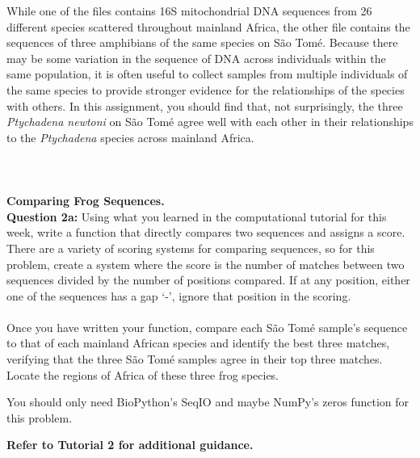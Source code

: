 While one of the files contains 16S mitochondrial DNA sequences from 26
different species scattered throughout mainland Africa, the other file contains
the sequences of three amphibians of the same species on S\~ao Tom\'e. Because
there may be some variation in the sequence of DNA across individuals within the
same population,  it is often useful to collect samples from multiple
individuals of the same species  to provide stronger evidence for the
relationships of the species with others. In this assignment, you should find
that, not surprisingly, the three \emph{Ptychadena newtoni} on S\~ao Tom\'e
agree well with each other in their relationships to the \emph{Ptychadena}
species across mainland Africa.\\
\\
\\
\\
{\bf{Comparing Frog Sequences.}}\\

\textbf{Question 2a:} Using what you learned in the computational tutorial for
this week, write a function that directly compares two sequences and assigns a
score. There are a variety of scoring systems for comparing sequences, so for
this problem, create a system where the score  is the number of matches between
two sequences divided by the number of positions compared. If at any position,
either one of  the sequences has a gap `-', ignore that position in the
scoring.\\ \\Once you have written your function, compare each S\~{a}o Tom\'{e}
sample's sequence 	to that of each mainland African species and identify the
best three matches, verifying that the three S\~{a}o Tom\'{e} samples agree in
their top three matches. Locate the regions of Africa of these three frog
species.

You should only need BioPython's SeqIO and maybe NumPy's zeros function for this
problem.

\textbf{Refer to Tutorial 2 for additional guidance.}\\

